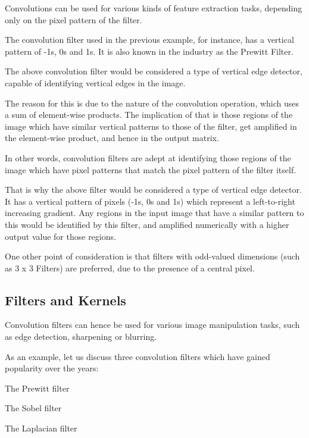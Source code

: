	\begin{bulletedlist}
		\item Convolutions can be used for various kinds of feature extraction tasks, depending only on the pixel pattern of the filter.
		\item The convolution filter used in the previous example, for instance, has a vertical pattern of -1s, 0s and 1s.  It is also known in the industry as the Prewitt Filter.
		\item The above convolution filter would be considered a type of vertical edge detector, capable of identifying vertical edges in the image.
		\item The reason for this is due to the nature of the convolution operation, which uses a sum of element-wise products. The  implication of that is those regions of the image which have similar vertical patterns to those of the filter, get amplified in
the element-wise product, and hence in the output matrix.
		\item In other words, convolution filters are adept at identifying those regions of the image which have pixel patterns that match the pixel pattern of the filter itself.
		\item That is why the above filter would be considered a type of vertical edge detector.  It has a vertical pattern of pixels (-1s, 0s and 1s) which represent a left-to-right increasing gradient.  Any regions in the input image that have a similar pattern to this would be identified by this filter, and amplified numerically with a higher output value for those regions.
		\item One other point of consideration is that filters with odd-valued dimensions (such as 3 x 3 Filters) are preferred, due to the presence of a central pixel.
	\end{bulletedlist}


	\subsection{Filters and Kernels}
	\begin{bulletedlist}
		\item Convolution filters can hence be used for various image manipulation tasks, such as edge detection, sharpening or blurring.
		\item As an example, let us discuss three convolution filters which have gained popularity over the years:
		\begin{bulletedlist}
			\item The Prewitt filter
			\item The Sobel filter
			\item The Laplacian filter
		\end{bulletedlist}
	\end{bulletedlist}

